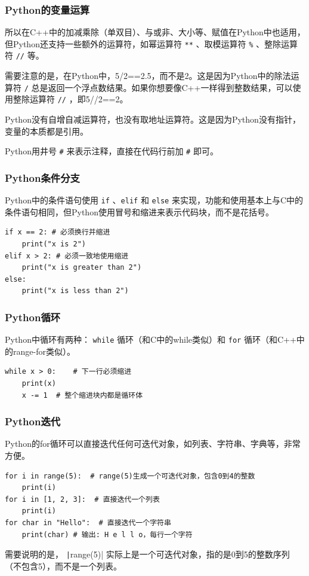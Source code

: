 \begin{frame}[fragile]
    \frametitle{Python的变量运算}

    所以在C++中的加减乘除（单双目）、与或非、大小等、赋值在Python中也适用，但Python还支持一些额外的运算符，如幂运算符 \texttt{**} 、取模运算符 \verb|%| 、整除运算符 \texttt{//} 等。

    需要注意的是，在Python中，5/2==2.5，而不是2。这是因为Python中的除法运算符 \texttt{/} 总是返回一个浮点数结果。如果你想要像C++一样得到整数结果，可以使用整除运算符 \texttt{//} ，即5//2==2。

    Python没有自增自减运算符，也没有取地址运算符。这是因为Python没有指针，变量的本质都是引用。

    Python用井号 \texttt{\#} 来表示注释，直接在代码行前加 \texttt{\#} 即可。

\end{frame}

\begin{frame}[fragile]
    \frametitle{Python条件分支}

    Python中的条件语句使用 \texttt{if} 、\texttt{elif} 和 \texttt{else} 来实现，功能和使用基本上与C中的条件语句相同，但Python使用冒号和缩进来表示代码块，而不是花括号。

    \begin{verbatim}
if x == 2: # 必须换行并缩进
    print("x is 2")
elif x > 2: # 必须一致地使用缩进
    print("x is greater than 2")
else:
    print("x is less than 2")
    \end{verbatim}

\end{frame}

\begin{frame}[fragile]
    \frametitle{Python循环}

    Python中循环有两种： \texttt{while} 循环（和C中的while类似）和 \texttt{for} 循环（和C++中的range-for类似）。
    \begin{verbatim}
while x > 0:    # 下一行必须缩进
    print(x)
    x -= 1  # 整个缩进块内都是循环体
    \end{verbatim}
\end{frame}

\begin{frame}[fragile]
    \frametitle{Python迭代}

    Python的for循环可以直接迭代任何可迭代对象，如列表、字符串、字典等，非常方便。
    \begin{verbatim}
for i in range(5):  # range(5)生成一个可迭代对象，包含0到4的整数
    print(i)
for i in [1, 2, 3]:  # 直接迭代一个列表
    print(i)
for char in "Hello":  # 直接迭代一个字符串
    print(char) # 输出: H e l l o，每行一个字符
    \end{verbatim}
    需要说明的是， \texttt|range(5)| 实际上是一个可迭代对象，指的是0到5的整数序列（不包含5），而不是一个列表。
\end{frame}

